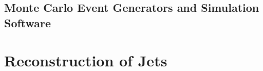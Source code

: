 \subsection{Monte Carlo Event Generators and Simulation Software}

\section{Reconstruction of Jets} 
\begin{comment}

 \begin{itemize}
\item
\textbf{Inner Tracking System :} The charged particles produced from the LHC collisions leave their trajectories as they move outward from the interaction point. These trajectories are measured precisely and efficiently by the inner tracking system of CMS. The inner tracking system also reconstructs secondary vertices. It surrounds the interaction point and has a cylindrical volume of length of 5.8 m and a diameter of 2.5 m. A pixel detector with three barrel layers at radii between 4.4 cm and 10.2 cm and a silicon strip tracker with 10 barrel detection layers extending outwards to a radius of 1.1 m are the integral parts of the tracking system. Two disks form the endcaps in the pixel detector whereas 3 plus 9 disks on each side of the barrel completes the strip tracker on its end. These endcaps extend the acceptance of the tracker up to a pseudorapidity of $|\eta| < 2.5$ ($\eta$ = $-$ log tan($\frac{\theta}{2}$), where $\theta$ is the angle between particle momentum and beam direction). The active silicon area of CMS tracker is about 200m$^{2}$ which makes it the largest silicon tracker. There are calorimeters outside the tracker to measure the energy of particles. The tracker should interfere with the particles to a minimum extent so that their momentum can be measured precisely. To measure their energy, they are required to interact with the calorimeters fully.
 \item
\textbf{Electromagnetic Calorimeter :} The electromagnetic calorimeter (ECAL)~\cite{ecal} consists of an array of lead tungstate (PbWO$_{4}$) crystals with coverage in pseudorapidity up-to $|\eta| <$ 3.0. The produced photons and electrons interact with matter mainly through bremsstrahlung and electron-positron pair production and deposit most of their energy in calorimeter. The deposited energy is converted to scintillation light which is detected by silicon avalanche photo diodes (APDs) in the barrel region and vacuum phototriodes (VPT) in the end-cap region. The number of created photons gives the direct measure of energy of the incident particle. Also, the pre-shower detectors made of lead absorbers and silicon detectors are put in front of the endcaps to distinguish high energetic single photons from low energetic photon pairs originating from $\pi^{0}$ decays. 


\end{comment}
